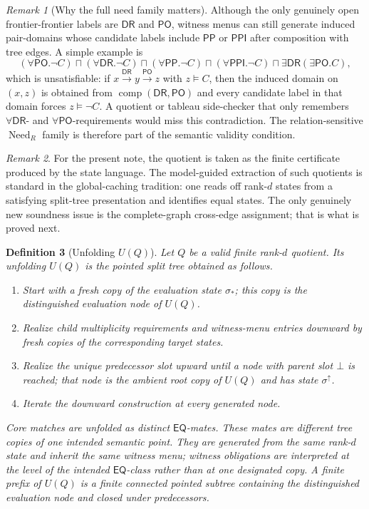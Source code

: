 \documentclass[11pt]{article}
\newtheorem{definition}{Definition}[section]
\theoremstyle{remark}
\newtheorem{remark}[definition]{Remark}
\newcommand{\DR}{\mathsf{DR}}
\newcommand{\PO}{\mathsf{PO}}
\newcommand{\PP}{\mathsf{PP}}
\newcommand{\PPI}{\mathsf{PPI}}
\newcommand{\EQ}{\mathsf{EQ}}
\newcommand{\Need}{\operatorname{Need}}
\newcommand{\comp}{\operatorname{comp}}
\begin{document}
\begin{remark}[Why the full need family matters]\label{rem:full-need}
Although the only genuinely open frontier-frontier labels are $\DR$ and $\PO$, witness menus can still generate induced pair-domains whose candidate labels include $\PP$ or $\PPI$ after composition with tree edges. A simple example is
\[
(\forall \PO.\neg C)\sqcap(\forall \DR.\neg C)\sqcap(\forall \PP.\neg C)\sqcap(\forall \PPI.\neg C)\sqcap \exists \DR(\exists \PO.C),
\]
which is unsatisfiable: if $x\xrightarrow{\DR}y\xrightarrow{\PO}z$ with $z\models C$, then the induced domain on $(x,z)$ is obtained from $\comp(\DR,\PO)$ and every candidate label in that domain forces $z\models\neg C$. A quotient or tableau side-checker that only remembers $\forall\DR$- and $\forall\PO$-requirements would miss this contradiction. The relation-sensitive $\Need_R$ family is therefore part of the semantic validity condition.
\end{remark}

\begin{remark}
For the present note, the quotient is taken as the finite certificate produced by the state language. The model-guided extraction of such quotients is standard in the global-caching tradition: one reads off rank-$d$ states from a satisfying split-tree presentation and identifies equal states. The only genuinely new soundness issue is the complete-graph cross-edge assignment; that is what is proved next.
\end{remark}

\begin{definition}[Unfolding $U(Q)$]\label{def:UQ}
Let $Q$ be a valid finite rank-$d$ quotient. Its unfolding $U(Q)$ is the pointed split tree obtained as follows.
\begin{enumerate}[label=(\roman*)]
    \item Start with a fresh copy of the evaluation state $\sigma_{\ast}$; this copy is the distinguished evaluation node of $U(Q)$.
    \item Realize child multiplicity requirements and witness-menu entries downward by fresh copies of the corresponding target states.
    \item Realize the unique predecessor slot upward until a node with parent slot $\bot$ is reached; that node is the ambient root copy of $U(Q)$ and has state $\sigma^{\uparrow}$.
    \item Iterate the downward construction at every generated node.
\end{enumerate}
Core matches are unfolded as distinct $\EQ$-mates. These mates are different tree copies of one intended semantic point. They are generated from the same rank-$d$ state and inherit the same witness menu; witness obligations are interpreted at the level of the intended $\EQ$-class rather than at one designated copy. A \emph{finite prefix} of $U(Q)$ is a finite connected pointed subtree containing the distinguished evaluation node and closed under predecessors.
\end{definition}
\end{document}
